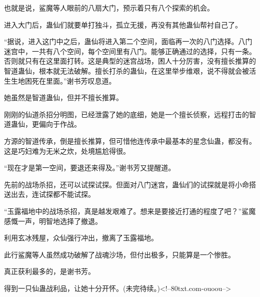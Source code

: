 \begin{this_body}
也就是说，鲨魔等人眼前的八扇大门，预示着只有八个探索的机会。

进入大门后，蛊仙们就要单打独斗，孤立无援，再没有其他蛊仙帮衬自己了。

“据说，进入这门中之后，蛊仙将进入第二个空间，面临再一次的八门选择。八门迷宫中，一共有八个空间，每个空间里有八门。能够正确通过的选择，只有一条。否则就只有在这里面打转。这是典型的迷宫战场，困人十分厉害，没有擅长推算的智道蛊仙，根本就无法破解。擅长打杀的蛊仙，在这里举步维艰，说不得就会被活生生地困死在里面。”谢书芳叹息道。

她虽然是智道蛊仙，但并不擅长推算。

刚刚的仙道杀招分明图，已经泄露了她的底细，她是一个擅长侦察，远程打击的智道蛊仙，更偏向于作战。

方源的智道传承，倒是擅长推算，但可惜他连传承中最基本的星念仙蛊，都没有。这是巧妇难为无米之炊，处境尴尬得很。

“现在才是第一空间，要退还来得及。”谢书芳又提醒道。

先前的战场杀招，还可以试探试探。但面对八门迷宫，蛊仙们的试探就是将小命搭送出去，连试探都不能试探。

“玉露福地中的战场杀招，真是越发艰难了。想来是要接近打通的程度了吧？”鲨魔感慨一声，明智地选择了撤退。

利用玄冰残屋，众仙强行冲出，撤离了玉露福地。

此行鲨魔等人虽然成功破解了战魂沙场，但付出极多，只能算是一个惨胜。

真正获利最多的，是谢书芳。

得到一只仙蛊战利品，让她十分开怀。(未完待续。)<!--80txt.com-ouoou-->

\end{this_body}

